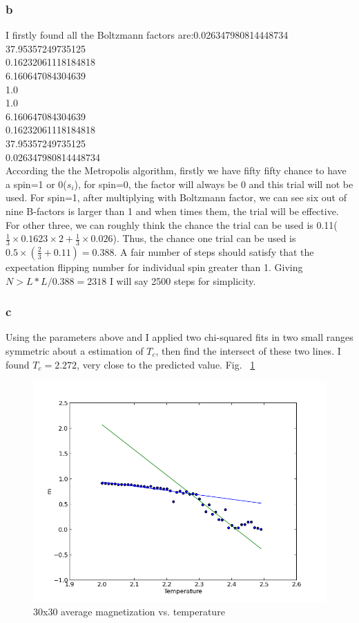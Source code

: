 \documentclass[11pt,letterpaper]{article}
\begin{document}
\subsubsection{b}
I firstly found all the Boltzmann factors are:0.026347980814448734\\
 37.95357249735125\\
 0.16232061118184818\\
  6.160647084304639\\1.0\\ 1.0\\6.160647084304639\\ 0.16232061118184818\\37.95357249735125\\ 0.026347980814448734\\
According the the Metropolis algorithm, firstly we have fifty fifty chance to have a spin=1 or 0($s_i$), for spin=0, the factor will always be 0 and this trial will not be used. For spin=1, after multiplying with Boltzmann factor, we can see six out of nine B-factors is larger than 1 and when times them, the trial will be effective. For other three, we can roughly think the chance the trial can be used is 0.11($\frac{1}{3}\times0.1623\times2+\frac{1}{3}\times0.026$). Thus, the chance one trial can be used is $0.5\times(\frac{2}{3}+0.11)=0.388$. A fair number of steps should satisfy that the expectation flipping number for individual spin greater than 1. Giving $N>L*L/0.388=2318$ I will say  2500 steps for simplicity.

\subsubsection{c}
Using the parameters above and I applied two chi-squared fits in two small ranges symmetric about a estimation of $T_c$, then find the intersect of these two lines. I found $T_c=2.272$, very close to the predicted value. Fig. ~\ref{figure12}  

\begin{figure}
\begin{center}
\includegraphics[width=0.8\linewidth,angle=0]{p3c.png}
\caption{30x30 average magnetization vs. temperature}
\label{figure12}
\end{center}
\end{figure}
\end{document}
